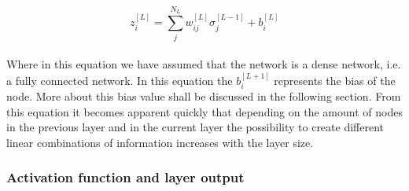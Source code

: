 \documentclass[12pt]{article}
\begin{document}
\begin{equation} \label{cache}
z^{[L]}_{i} = \sum_{j}^{N_{L}} w_{ij}^{[L]}\sigma_{j}^{[L-1]} + b_{i}^{[L]}
\end{equation}
\\
Where in this equation we have assumed that the network is a dense network, i.e. a fully connected network. In this equation the $b_{i}^{[L+1]}$ represents the bias of the node. More about this bias value shall be discussed in the following section.  From this equation it becomes apparent quickly that depending on the amount of nodes in the previous layer and in the current layer the possibility to create different linear combinations of information increases with the layer size.

\subsubsection{Activation function and layer output}
\end{document}
